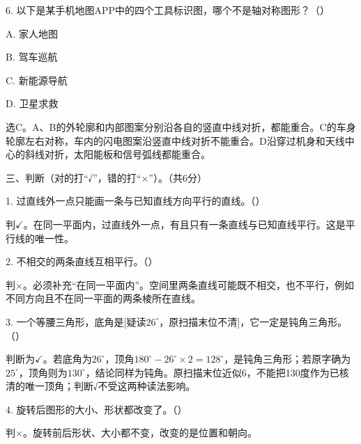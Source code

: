 6. 以下是某手机地图APP中的四个工具标识图，哪个不是轴对称图形？（\hspace{1.8em}）\par
\noindent A. 家人地图\par
\noindent B. 驾车巡航\par
\noindent C. 新能源导航\par
\noindent D. 卫星求救\par
{}
\begin{BookAnswer}
选C。A、B的外轮廓和内部图案分别沿各自的竖直中线对折，都能重合。C的车身轮廓左右对称，车内的闪电图案沿竖直中线对折不能重合。D沿穿过机身和天线中心的斜线对折，太阳能板和信号弧线都能重合。
\end{BookAnswer}

三、判断（对的打“√”，错的打“×”）。（共6分）\par 1. 过直线外一点只能画一条与已知直线方向平行的直线。（\hspace{1.8em}）\par
\begin{BookAnswer}
判\(\checkmark\)。在同一平面内，过直线外一点，有且只有一条直线与已知直线平行。这是平行线的唯一性。
\end{BookAnswer}

2. 不相交的两条直线互相平行。（\hspace{1.8em}）\par
\begin{BookAnswer}
判\(\times\)。必须补充“在同一平面内”。空间里两条直线可能既不相交，也不平行，例如不同方向且不在同一平面的两条棱所在直线。
\end{BookAnswer}

3. 一个等腰三角形，底角是[疑读\(26^\circ\)，原扫描末位不清]，它一定是钝角三角形。（\hspace{1.8em}）\par
\begin{BookAnswer}
判断为\(\checkmark\)。若底角为\(26^\circ\)，顶角\(180^\circ-26^\circ\times2=128^\circ\)，是钝角三角形；若原字确为\(25^\circ\)，顶角则为\(130^\circ\)，结论同样为钝角。原扫描末位近似6，不能把130度作为已核清的唯一顶角；判断√不受这两种读法影响。
\end{BookAnswer}

4. 旋转后图形的大小、形状都改变了。（\hspace{1.8em}）\par
\begin{BookAnswer}
判\(\times\)。旋转前后形状、大小都不变，改变的是位置和朝向。
\end{BookAnswer}

